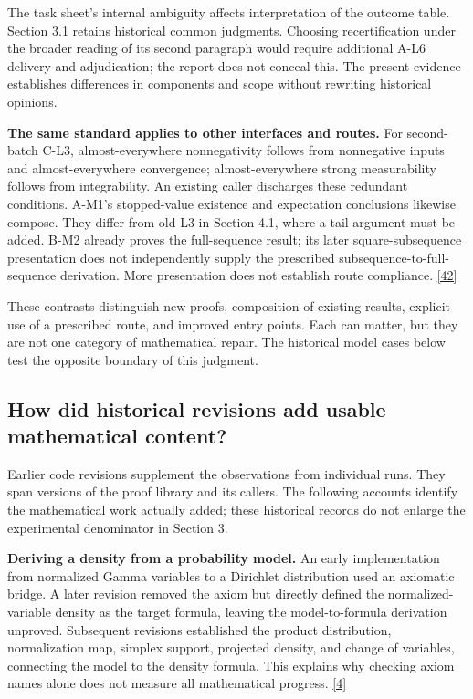The task sheet's internal ambiguity affects interpretation of the outcome table. Section 3.1 retains historical common judgments. Choosing recertification under the broader reading of its second paragraph would require additional A-L6 delivery and adjudication; the report does not conceal this. The present evidence establishes differences in components and scope without rewriting historical opinions.

\textbf{The same standard applies to other interfaces and routes.} For second-batch C-L3, almost-everywhere nonnegativity follows from nonnegative inputs and almost-everywhere convergence; almost-everywhere strong measurability follows from integrability. An existing caller discharges these redundant conditions. A-M1's stopped-value existence and expectation conclusions likewise compose. They differ from old L3 in Section 4.1, where a tail argument must be added. B-M2 already proves the full-sequence result; its later square-subsequence presentation does not independently supply the prescribed subsequence-to-full-sequence derivation. More presentation does not establish route compliance. \hyperlink{ref-42}{\mbox{[42]}}

These contrasts distinguish new proofs, composition of existing results, explicit use of a prescribed route, and improved entry points. Each can matter, but they are not one category of mathematical repair. The historical model cases below test the opposite boundary of this judgment.

\subsection[How did historical revisions add usable mathematical content?]{\texorpdfstring{\protect\hypertarget{section-4-5}{}How did historical revisions add usable mathematical content?}{How did historical revisions add usable mathematical content?}}
Earlier code revisions supplement the observations from individual runs. They span versions of the proof library and its callers. The following accounts identify the mathematical work actually added; these historical records do not enlarge the experimental denominator in Section 3.

\textbf{Deriving a density from a probability model.} An early implementation from normalized Gamma variables to a Dirichlet distribution used an axiomatic bridge. A later revision removed the axiom but directly defined the normalized-variable density as the target formula, leaving the model-to-formula derivation unproved. Subsequent revisions established the product distribution, normalization map, simplex support, projected density, and change of variables, connecting the model to the density formula. This explains why checking axiom names alone does not measure all mathematical progress. \hyperlink{ref-4}{\mbox{[4]}}

